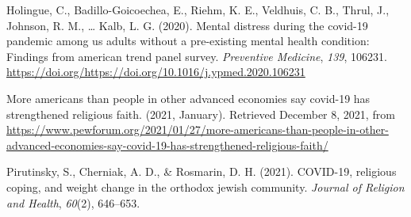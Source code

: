\documentclass[
  english,
  man]{apa6}
\begin{document}
\hypertarget{refs}{}
\leavevmode\hypertarget{ref-HOLINGUE2020106231}{}%
Holingue, C., Badillo-Goicoechea, E., Riehm, K. E., Veldhuis, C. B., Thrul, J., Johnson, R. M., \ldots{} Kalb, L. G. (2020). Mental distress during the covid-19 pandemic among us adults without a pre-existing mental health condition: Findings from american trend panel survey. \emph{Preventive Medicine}, \emph{139}, 106231. \url{https://doi.org/https://doi.org/10.1016/j.ypmed.2020.106231}

\leavevmode\hypertarget{ref-covid_us_faithfamily_2021}{}%
More americans than people in other advanced economies say covid-19 has strengthened religious faith. (2021, January). Retrieved December 8, 2021, from \url{https://www.pewforum.org/2021/01/27/more-americans-than-people-in-other-advanced-economies-say-covid-19-has-strengthened-religious-faith/}

\leavevmode\hypertarget{ref-pirutinsky2021covid}{}%
Pirutinsky, S., Cherniak, A. D., \& Rosmarin, D. H. (2021). COVID-19, religious coping, and weight change in the orthodox jewish community. \emph{Journal of Religion and Health}, \emph{60}(2), 646--653.
\end{document}

